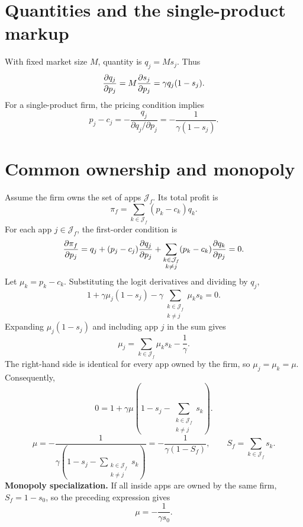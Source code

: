 \documentclass{article}
\begin{document}
\newpage
\section{Quantities and the single-product markup}
With fixed market size $M$, quantity is $q_j=Ms_j$. Thus
\begin{equation}
\frac{\partial q_j}{\partial p_j}=M\frac{\partial s_j}{\partial p_j}=\gamma q_j(1-s_j).
\end{equation}
For a single-product firm, the pricing condition implies
\begin{equation}
\boxed{
 p_j-c_j=-\frac{q_j}{\partial q_j/\partial p_j}
 =-\frac{1}{\gamma(1-s_j)}
}.
\end{equation}

\section{Common ownership and monopoly}
Assume the firm owns the set of apps $\mathcal J_f$. Its total profit is
\begin{equation}
\pi_f=\sum_{k\in\mathcal J_f}(p_k-c_k)q_k.
\end{equation}
For each app $j\in\mathcal J_f$, the first-order condition is
\begin{equation}
\frac{\partial\pi_f}{\partial p_j}
=q_j+(p_j-c_j)\frac{\partial q_j}{\partial p_j}
+\sum_{\substack{k\in\mathcal J_f\\k\ne j}}(p_k-c_k)\frac{\partial q_k}{\partial p_j}=0.
\end{equation}
Let $\mu_k=p_k-c_k$. Substituting the logit derivatives and dividing by $q_j$,
\begin{equation}
1+\gamma\mu_j(1-s_j)
-\gamma\sum_{\substack{k\in\mathcal J_f\\k\ne j}}\mu_k s_k=0.
\end{equation}
Expanding $\mu_j(1-s_j)$ and including app $j$ in the sum gives
\begin{equation}
\mu_j=\sum_{k\in\mathcal J_f}\mu_k s_k-\frac{1}{\gamma}.
\end{equation}
The right-hand side is identical for every app owned by the firm, so
$\mu_j=\mu_k=\mu$. Consequently,
\begin{equation}
0=1+\gamma\mu\left(1-s_j-
 \sum_{\substack{k\in\mathcal J_f\\k\ne j}}s_k\right).
\end{equation}
\begin{equation}
\boxed{\mu=-\frac{1}{\gamma\left(1-s_j-
 \sum_{\substack{k\in\mathcal J_f\\k\ne j}}s_k\right)}
 =-\frac{1}{\gamma(1-S_f)}},
\qquad S_f=\sum_{k\in\mathcal J_f}s_k.
\end{equation}
\textbf{Monopoly specialization.} If all inside apps are owned by the same
firm, $S_f=1-s_0$, so the preceding expression gives
\[
\boxed{\mu=-\frac{1}{\gamma s_0}}.
\]
\vfill

\clearpage
\endgroup
\end{document}
